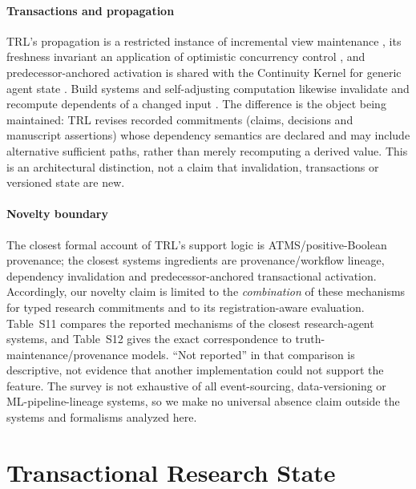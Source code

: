 \documentclass[journal]{IEEEtran}
\begin{document}
\paragraph{Transactions and propagation}
TRL's propagation is a restricted instance of incremental view maintenance \cite{gupta1995maintenance}, its freshness invariant an application of optimistic concurrency control \cite{kung1981optimistic}, and predecessor-anchored activation is shared with the Continuity Kernel for generic agent state \cite{he2026continuity}. Build systems and self-adjusting computation likewise invalidate and recompute dependents of a changed input \cite{feldman1979make,mokhov2018build,acar2009selfadjusting}. The difference is the object being maintained: TRL revises recorded commitments (claims, decisions and manuscript assertions) whose dependency semantics are declared and may include alternative sufficient paths, rather than merely recomputing a derived value. This is an architectural distinction, not a claim that invalidation, transactions or versioned state are new.

\paragraph{Novelty boundary}
The closest formal account of TRL's support logic is ATMS/positive-Boolean provenance; the closest systems ingredients are provenance/workflow lineage, dependency invalidation and predecessor-anchored transactional activation. Accordingly, our novelty claim is limited to the \emph{combination} of these mechanisms for typed research commitments and to its registration-aware evaluation. Table~S11 compares the reported mechanisms of the closest research-agent systems, and Table~S12 gives the exact correspondence to truth-maintenance/provenance models. ``Not reported'' in that comparison is descriptive, not evidence that another implementation could not support the feature. The survey is not exhaustive of all event-sourcing, data-versioning or ML-pipeline-lineage systems, so we make no universal absence claim outside the systems and formalisms analyzed here.

\section{Transactional Research State}
\label{sec:trl_method}
\end{document}
